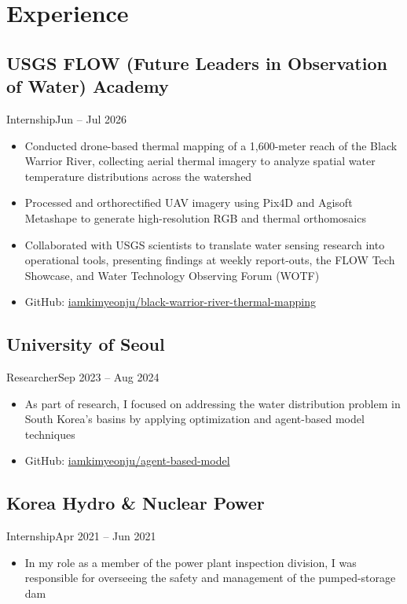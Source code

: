 \section{Experience}
\subsection{USGS FLOW (Future Leaders in Observation of Water) Academy}{Internship}{Jun -- Jul 2026}
\begin{itemize}
    \item Conducted drone-based thermal mapping of a 1,600-meter reach of 
    the Black Warrior River, collecting aerial thermal imagery to analyze 
    spatial water temperature distributions across the watershed
    \item Processed and orthorectified UAV imagery using Pix4D and Agisoft 
    Metashape to generate high-resolution RGB and thermal orthomosaics
    \item Collaborated with USGS scientists to translate water sensing research into operational tools, presenting findings at weekly report-outs, the FLOW Tech Showcase, and Water Technology Observing Forum (WOTF) 
    \item GitHub: \href{https://github.com/iamkimyeonju/black-warrior-river-thermal-mapping}{iamkimyeonju/black-warrior-river-thermal-mapping}
\end{itemize}
\subsection{University of Seoul}{Researcher}{Sep 2023 -- Aug 2024}
\begin{itemize}
    \item As part of research, I focused on addressing the water distribution problem in South Korea's basins by applying  optimization and agent-based model techniques
    \item GitHub: \href{https://github.com/iamkimyeonju/agent-based-model}{iamkimyeonju/agent-based-model}
\end{itemize}
\subsection{Korea Hydro \& Nuclear Power}{Internship}{Apr 2021 -- Jun 2021}
\begin{itemize}
  \item In my role as a member of the power plant inspection division, I was responsible for overseeing the safety and management of the pumped-storage dam     
\end{itemize}
